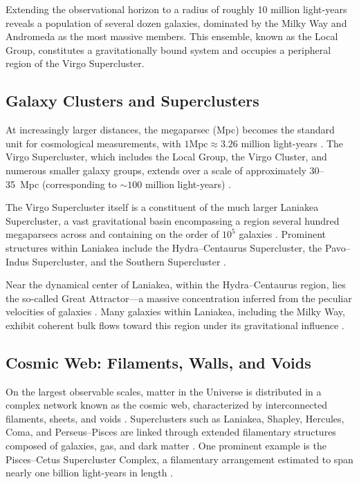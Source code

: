 Extending the observational horizon to a radius of roughly 10 million light-years reveals a population of several dozen galaxies, dominated by the Milky Way and Andromeda as the most massive members. This ensemble, known as the Local Group, constitutes a gravitationally bound system and occupies a peripheral region of the Virgo Supercluster.

\subsection{Galaxy Clusters and Superclusters}

At increasingly larger distances, the megaparsec (Mpc) becomes the standard unit for cosmological measurements, with $1 \mathrm{Mpc} \approx 3.26$ million light-years \citep{Hogg1999}. The Virgo Supercluster, which includes the Local Group, the Virgo Cluster, and numerous smaller galaxy groups, extends over a scale of approximately 30--35~Mpc (corresponding to $\sim 100$ million light-years) \citep{Tully1982, Courtois2013}.

The Virgo Supercluster itself is a constituent of the much larger Laniakea Supercluster, a vast gravitational basin encompassing a region several hundred megaparsecs across and containing on the order of $10^{5}$ galaxies \citep{Tully2014}. Prominent structures within Laniakea include the Hydra--Centaurus Supercluster, the Pavo--Indus Supercluster, and the Southern Supercluster \citep{Tully2014}.




Near the dynamical center of Laniakea, within the Hydra--Centaurus region, lies the so-called Great Attractor—a massive concentration inferred from the peculiar velocities of galaxies \citep{Dressler1987, LyndenBell1988}. Many galaxies within Laniakea, including the Milky Way, exhibit coherent bulk flows toward this region under its gravitational influence \citep{Tully2014, Courtois2013}.

\subsection{Cosmic Web: Filaments, Walls, and Voids}


On the largest observable scales, matter in the Universe is distributed in a complex network known as the cosmic web, characterized by interconnected filaments, sheets, and voids \citep{Bond1996}. Superclusters such as Laniakea, Shapley, Hercules, Coma, and Perseus--Pisces are linked through extended filamentary structures composed of galaxies, gas, and dark matter \citep{Springel2006, Tempel2014}. One prominent example is the Pisces--Cetus Supercluster Complex, a filamentary arrangement estimated to span nearly one billion light-years in length \citep{Tully1987}.

